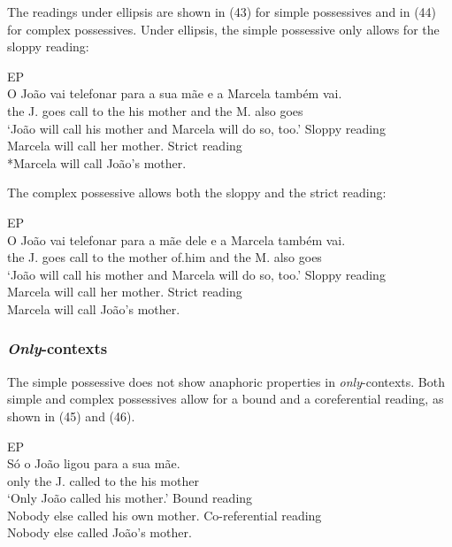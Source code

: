 \documentclass[output=paper]{langsci/langscibook}
\begin{document}
The readings under ellipsis are shown in (43) for simple possessives and in (44) for complex possessives. Under ellipsis, the simple possessive only allows for the sloppy reading:

\ea%
         EP\label{ex:wein:43}\\
    \ea  
    \gll O João vai telefonar para a sua mãe e a Marcela também vai.\\
         the J.   goes call to the his mother and the M. also goes\\
    \glt ‘João will call his mother and Marcela will do so, too.’
    \ex Sloppy reading\\
        Marcela will call her mother.
    \ex Strict reading\\
        *Marcela will call João’s mother.
    \z  
\z

\noindent The complex possessive allows both the sloppy and the strict reading:

\ea%
         EP\label{ex:wein:44}\\
    \ea  
    \gll O João vai telefonar para a mãe   dele e   a Marcela também vai.\\
         the J. goes call to the mother of.him and the M. also goes\\
    \glt ‘João will call his mother and Marcela will do so, too.’
    \ex  Sloppy reading\\
         Marcela will call her mother.
    \ex  Strict reading\\
         Marcela will call João’s mother.
    \z
\z



\subsubsection{\textit{Only}-contexts}%

The simple possessive does not show anaphoric properties in \textit{only}{}-contexts. Both simple and complex possessives allow for a bound and a coreferential reading, as shown in (45) and (46).

\ea%
         EP\label{ex:wein:45}\\
    \ea  
    \gll Só o João ligou para a sua mãe.\\
         only the J. called to the his mother\\
    \glt ‘Only João called his mother.’
    \ex  Bound reading\\
         Nobody else called his own mother.
    \ex  Co-referential reading\\
         Nobody else called João’s mother.
    \z
\z
\end{document}
